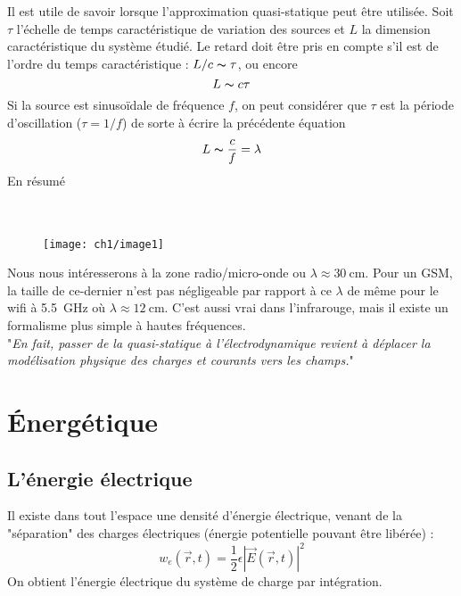 \newpage
Il est utile de savoir lorsque l'approximation quasi-statique peut être utilisée. Soit 
$\tau$ l'échelle de temps caractéristique de variation des sources et $L$ la dimension 
caractéristique du système étudié. Le retard doit être pris en compte s'il est de l'ordre 
du temps caractéristique : $L/c \thicksim \tau$, ou encore
\begin{equation}
L \thicksim c\tau
\end{equation}
Si la source est sinusoïdale de fréquence $f$, on peut considérer que $\tau$ est 
la période d'oscillation ($\tau = 1/f$) de sorte à écrire la précédente équation
\begin{equation}
L \thicksim \frac{c}{f} = \lambda
\end{equation}
En résumé\\
\ \\ \\

\begin{wrapfigure}[10]{l}{5.2cm}
\vspace{-5mm}
\texttt{[image: ch1/image1]}
\end{wrapfigure}
Nous nous intéresserons à la zone radio/micro-onde ou $\lambda\approx \SI{30}{\centi\meter}$. Pour un 
GSM, la taille de ce-dernier n'est pas négligeable par rapport à ce $\lambda$ de 
même pour le wifi à \SI{5.5}{\giga\hertz} où $\lambda\approx \SI{12}{\centi\meter}$. C'est aussi vrai dans l'infrarouge, 
mais il existe un formalisme plus simple à hautes fréquences.\\

"\textit{En fait, passer de la quasi-statique à l'électrodynamique revient à déplacer 
la modélisation physique des charges et courants vers les champs.}"


\section{Énergétique}
\subsection{L'énergie électrique}
Il existe dans tout l'espace une densité d'énergie électrique, venant de la "séparation" 
des charges électriques (énergie potentielle pouvant être libérée) :
\begin{equation}
w_e(\vec{r},t) = \frac{1}{2}\epsilon|\vec{E}(\vec{r},t)|^2
\end{equation}
On obtient l'énergie électrique du système de charge par intégration.

